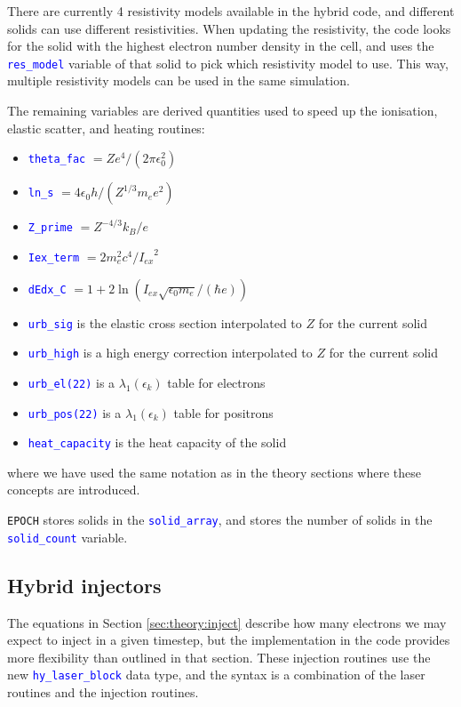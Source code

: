 \documentclass[12pt]{article}
\numberwithin{equation}{section}
\begin{document}
There are currently 4 resistivity models available in the hybrid code, and different solids can use different resistivities. When updating the resistivity, the code looks for the solid with the highest electron number density in the cell, and uses the \textcolor{blue}{\texttt{res\_model}} variable of that solid to pick which resistivity model to use. This way, multiple resistivity models can be used in the same simulation.

The remaining variables are derived quantities used to speed up the ionisation, elastic scatter, and heating routines:
%
\begin{itemize}
\item \textcolor{blue}{\texttt{theta\_fac}} $= Ze^4/(2\pi\epsilon_0^2)$
\item \textcolor{blue}{\texttt{ln\_s}} $=4\epsilon_0 h / (Z^{1/3}m_e e^2)$
\item \textcolor{blue}{\texttt{Z\_prime}} $ = Z^{-4/3}k_B/e$
\item \textcolor{blue}{\texttt{Iex\_term}} $= 2m_e^2c^4/{I_{ex}}^2$
\item \textcolor{blue}{\texttt{dEdx\_C}} $= 1 + 2\ln\left(I_{ex}\sqrt{\epsilon_0 m_e}/(\hbar e)\right)$
\item \textcolor{blue}{\texttt{urb\_sig}} is the elastic cross section interpolated to $Z$ for the current solid
\item \textcolor{blue}{\texttt{urb\_high}} is a high energy correction interpolated to $Z$ for the current solid
\item \textcolor{blue}{\texttt{urb\_el(22)}} is a $\lambda_1(\epsilon_k)$ table for electrons 
\item \textcolor{blue}{\texttt{urb\_pos(22)}} is a $\lambda_1(\epsilon_k)$ table for positrons
\item \textcolor{blue}{\texttt{heat\_capacity}} is the heat capacity of the solid
\end{itemize}
%
where we have used the same notation as in the theory sections where these concepts are introduced.

\texttt{EPOCH} stores solids in the \textcolor{blue}{\texttt{solid\_array}}, and stores the number of solids in the \textcolor{blue}{\texttt{solid\_count}} variable.

\subsection{Hybrid injectors} \label{sec:code:injector}

The equations in Section \ref{sec:theory:inject} describe how many electrons we may expect to inject in a given timestep, but the implementation in the code provides more flexibility than outlined in that section. These injection routines use the new \textcolor{blue}{\texttt{hy\_laser\_block}} data type, and the syntax is a combination of the laser routines and the injection routines.
\end{document}

